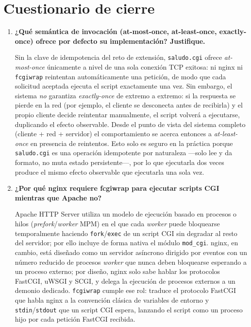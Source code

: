 \section{Cuestionario de cierre}

\begin{enumerate}[label=\arabic*.]

\item \textbf{¿Qué semántica de invocación (at-most-once, at-least-once, exactly-once) ofrece por defecto su implementación? Justifique.}

Sin la clave de idempotencia del reto de extensión, \texttt{saludo.cgi} ofrece \emph{at-most-once} únicamente a nivel de una sola conexión TCP exitosa: ni nginx ni \texttt{fcgiwrap} reintentan automáticamente una petición, de modo que cada solicitud aceptada ejecuta el script exactamente una vez. Sin embargo, el sistema \emph{no} garantiza \emph{exactly-once} de extremo a extremo: si la respuesta se pierde en la red (por ejemplo, el cliente se desconecta antes de recibirla) y el propio cliente decide reintentar manualmente, el script volverá a ejecutarse, duplicando el efecto observable. Desde el punto de vista del sistema completo (cliente + red + servidor) el comportamiento se acerca entonces a \emph{at-least-once} en presencia de reintentos. Esto solo es seguro en la práctica porque \texttt{saludo.cgi} es una operación idempotente por naturaleza —solo lee y da formato, no muta estado persistente—, por lo que ejecutarla dos veces produce el mismo efecto observable que ejecutarla una sola vez.

\item \textbf{¿Por qué nginx requiere fcgiwrap para ejecutar scripts CGI mientras que Apache no?}

Apache HTTP Server utiliza un modelo de ejecución basado en procesos o hilos (\emph{prefork}/\emph{worker} MPM) en el que cada \emph{worker} puede bloquearse temporalmente haciendo \texttt{fork}/\texttt{exec} de un script CGI sin degradar al resto del servidor; por ello incluye de forma nativa el módulo \texttt{mod\_cgi}. nginx, en cambio, está diseñado como un servidor asíncrono dirigido por eventos con un número reducido de procesos \emph{worker} que nunca deben bloquearse esperando a un proceso externo; por diseño, nginx solo sabe hablar los protocolos FastCGI, uWSGI y SCGI, y delega la ejecución de procesos externos a un demonio dedicado. \texttt{fcgiwrap} cumple ese rol: traduce el protocolo FastCGI que habla nginx a la convención clásica de variables de entorno y \texttt{stdin}/\texttt{stdout} que un script CGI espera, lanzando el script como un proceso hijo por cada petición FastCGI recibida.


\end{enumerate}
